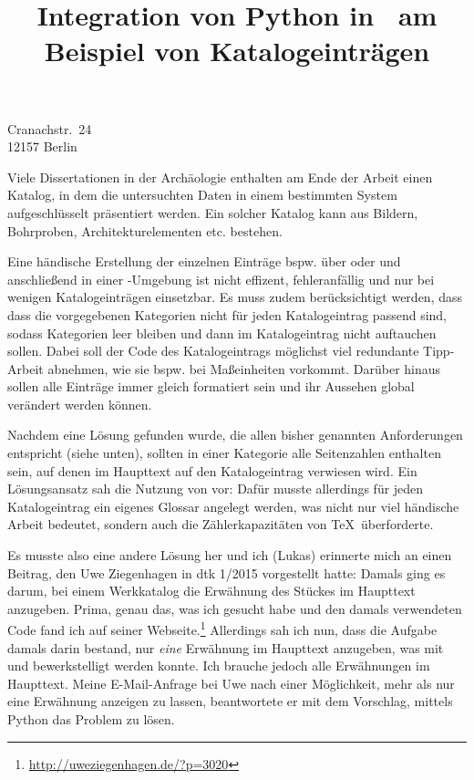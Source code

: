 \documentclass[ngerman]{dtk}
\begin{document}
\title{Integration von Python in \XeLaTeX\ am Beispiel von Katalogeinträgen}
%
			{Cranachstr.~24\\
			12157 Berlin\\
			}
\maketitle



Viele Dissertationen in der Archäologie enthalten am Ende der Arbeit einen Katalog, 
in dem die untersuchten Daten in einem bestimmten System aufgeschlüsselt präsentiert werden.
Ein solcher Katalog kann aus  Bildern, Bohrproben, Architekturelementen etc. bestehen.

Eine händische Erstellung der einzelnen Einträge bspw. über  oder  
und anschließend in einer -Umgebung ist nicht effizent, fehleranfällig und nur bei wenigen Katalogeinträgen einsetzbar.
Es muss zudem berücksichtigt werden, dass  dass die vorgegebenen Kategorien nicht für jeden Katalogeintrag passend sind, 
sodass  Kategorien leer bleiben  und dann im Katalogeintrag nicht auftauchen sollen.
Dabei soll der Code des Katalogeintrags möglichst viel redundante Tipp-Arbeit abnehmen, wie sie bspw. bei Maßeinheiten vorkommt.
Darüber hinaus sollen alle Einträge immer gleich formatiert sein und ihr Aussehen global verändert werden können.

Nachdem  eine  Lösung gefunden wurde, die allen bisher genannten Anforderungen entspricht (siehe unten),
sollten in einer Kategorie alle Seitenzahlen enthalten sein, auf denen im Haupttext auf den Katalogeintrag verwiesen wird.
Ein  Lösungsansatz sah die Nutzung von   vor: 
Dafür musste allerdings für jeden Katalogeintrag ein eigenes Glossar angelegt werden, was nicht nur viel händische Arbeit bedeutet,
sondern auch die Zählerkapazitäten von \TeX\ überforderte.

Es musste also eine andere Lösung her und ich (Lukas) erinnerte mich an einen Beitrag, den Uwe Ziegenhagen in dtk 1/2015 vorgestellt hatte:
Damals ging es darum, bei einem Werkkatalog die Erwähnung des Stückes im Haupttext anzugeben. 
Prima, genau das, was ich gesucht habe und den damals verwendeten Code fand  ich auf seiner Webseite.\footnote{\url{http://uweziegenhagen.de/?p=3020}}
Allerdings  sah ich nun, dass die Aufgabe  damals darin bestand, nur \emph{eine} Erwähnung im  Haupttext anzugeben,
was mit  und  bewerkstelligt werden konnte.
Ich brauche jedoch alle Erwähnungen im Haupttext.
Meine E-Mail-Anfrage bei Uwe nach einer Möglichkeit, mehr als nur eine Erwähnung anzeigen zu lassen,
beantwortete er mit dem Vorschlag, mittels Python das Problem zu lösen.
\end{document}
